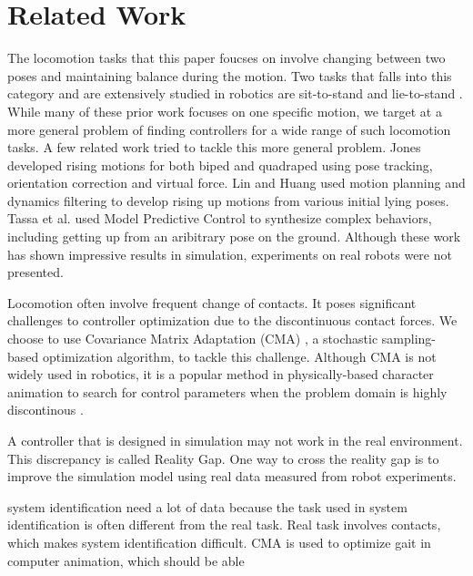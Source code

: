 \section{Related Work}

The locomotion tasks that this paper foucses on involve changing between two poses and maintaining balance during the motion. Two tasks that falls into this category and are extensively studied in robotics are sit-to-stand \cite{Faloutsos:2003,Iida:2004,Pchelkin:2010,Mistry:2010,Bahar:2014} and lie-to-stand \cite{morimoto:1998,Faloutsos:2001,Kanehiro:2007,Hirukawa:2005}. While many of these prior work focuses on one specific motion, we target at a more general problem of finding controllers for a wide range of such locomotion tasks. A few related work tried to tackle this more general problem. Jones \cite{jones:2011} developed rising motions for both biped and quadraped using pose tracking, orientation correction and virtual force. Lin and Huang \cite{lin:2012} used motion planning and dynamics filtering to develop rising up motions from various initial lying poses. Tassa et al. \cite{tassa:2012} used Model Predictive Control to synthesize complex behaviors, including getting up from an aribitrary pose on the ground. Although these work has shown impressive results in simulation, experiments on real robots were not presented.

Locomotion often involve frequent change of contacts. It poses significant challenges to controller optimization due to the discontinuous contact forces. We choose to use Covariance Matrix Adaptation (CMA) \cite{Hansen:2004}, a stochastic sampling-based optimization algorithm, to tackle this challenge. Although CMA is not widely used in robotics, it is a popular method in physically-based character animation to search for control parameters when the problem domain is highly discontinous \cite{Wu:2010, Wang:2010, Tan:2011}.

A controller that is designed in simulation may not work in the real environment. This discrepancy is called Reality Gap. One way to cross the reality gap is to improve the simulation model using real data measured from robot experiments. 

system identification need a lot of data because the task used in system identification is often different from the real task. Real task involves contacts, which makes system identification difficult. CMA is used to optimize gait in computer animation, which should be able 

